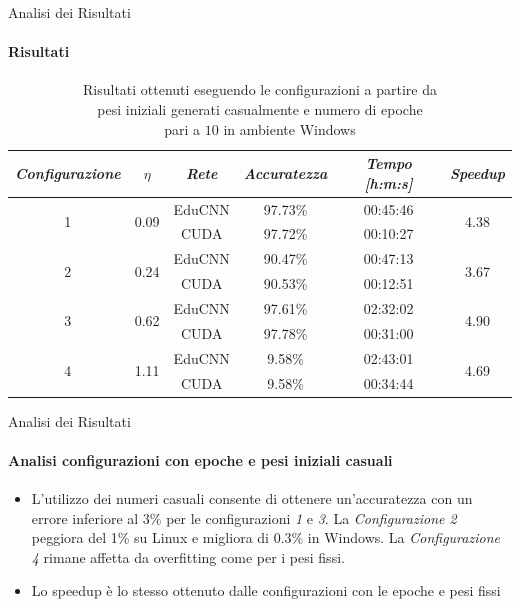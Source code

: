 \documentclass[
 ]{beamer}
\begin{document}
\begin{frame}{Analisi dei Risultati}
    \framesubtitle{Risultati}

        \begin{table}
            \centering
            \renewcommand\arraystretch{1.3}
            \small
            \begin{tabular}{| c | c | c | c | c | c |}
                \hline
                \emph{Configurazione} & $\eta$ & \emph{Rete} & \emph{Accuratezza} & \emph{Tempo [h:m:s]} & \emph{Speedup} \\
                \hline
                \multirow{2}{*}{1} & \multirow{2}{*}{0.09} & EduCNN & 97.73\% & 00:45:46 & \multirow{2}{*}{4.38} \\ \cline{3-5} 
                                   &                       & CUDA   & 97.72\% & 00:10:27  & \\
                \hline
                \multirow{2}{*}{2} & \multirow{2}{*}{0.24} & EduCNN & 90.47\% & 00:47:13 & \multirow{2}{*}{3.67} \\ \cline{3-5} 
                                   &                       & CUDA   & 90.53\% & 00:12:51 & \\
                \hline
                \multirow{2}{*}{3} & \multirow{2}{*}{0.62} & EduCNN & 97.61\% & 02:32:02 & \multirow{2}{*}{4.90} \\ \cline{3-5} 
                                   &                       & CUDA   & 97.78\% & 00:31:00 & \\
                \hline
                \multirow{2}{*}{4} & \multirow{2}{*}{1.11} & EduCNN & 9.58\% & 02:43:01 & \multirow{2}{*}{4.69} \\ \cline{3-5} 
                                   &                       & CUDA   & 9.58\% & 00:34:44 & \\
                \hline
            \end{tabular}
            \caption            
    {Risultati ottenuti eseguendo le configurazioni a partire da \\ pesi iniziali generati casualmente e numero di epoche \\ pari a $10$ in ambiente Windows \endtabular}          
        \end{table}    
\end{frame}


\begin{frame}{Analisi dei Risultati}
    \framesubtitle{Analisi configurazioni con epoche e pesi iniziali casuali}
    \smallskip
    \begin{itemize} [<+->]
        \setlength\itemsep{2em}
        \item \large L'utilizzo dei numeri casuali consente di ottenere un'accuratezza con un errore inferiore al 3\% per le configurazioni \emph{1} e \emph{3}. La \emph{Configurazione 2} peggiora del 1\% su Linux e migliora di 0.3\% in Windows. La \emph{Configurazione 4} rimane affetta da overfitting come per i pesi fissi.
        \item \large Lo speedup è lo stesso ottenuto dalle configurazioni con le epoche e pesi fissi
    \end{itemize}     
\end{frame}
\end{document}
